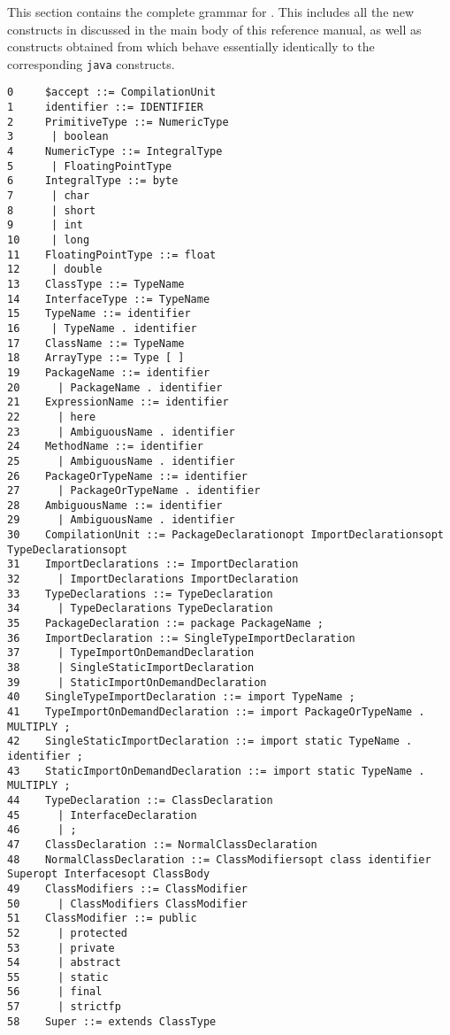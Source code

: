 \label{X10 syntax}

This section contains the complete grammar for \Xten{}. This includes
all the new constructs in \Xten{} discussed in the main body of this
reference manual, as well as constructs obtained from \java{} which
behave essentially identically to the corresponding {\tt java} constructs.
\onecolumn
{\footnotesize
\begin{verbatim}
0     $accept ::= CompilationUnit
1     identifier ::= IDENTIFIER
2     PrimitiveType ::= NumericType
3      | boolean
4     NumericType ::= IntegralType
5      | FloatingPointType
6     IntegralType ::= byte
7      | char
8      | short
9      | int
10     | long
11    FloatingPointType ::= float
12     | double
13    ClassType ::= TypeName
14    InterfaceType ::= TypeName
15    TypeName ::= identifier
16     | TypeName . identifier
17    ClassName ::= TypeName
18    ArrayType ::= Type [ ]
19    PackageName ::= identifier
20      | PackageName . identifier
21    ExpressionName ::= identifier
22      | here
23      | AmbiguousName . identifier
24    MethodName ::= identifier
25      | AmbiguousName . identifier
26    PackageOrTypeName ::= identifier
27      | PackageOrTypeName . identifier
28    AmbiguousName ::= identifier
29      | AmbiguousName . identifier
30    CompilationUnit ::= PackageDeclarationopt ImportDeclarationsopt TypeDeclarationsopt
31    ImportDeclarations ::= ImportDeclaration
32      | ImportDeclarations ImportDeclaration
33    TypeDeclarations ::= TypeDeclaration
34      | TypeDeclarations TypeDeclaration
35    PackageDeclaration ::= package PackageName ;
36    ImportDeclaration ::= SingleTypeImportDeclaration
37      | TypeImportOnDemandDeclaration
38      | SingleStaticImportDeclaration
39      | StaticImportOnDemandDeclaration
40    SingleTypeImportDeclaration ::= import TypeName ;
41    TypeImportOnDemandDeclaration ::= import PackageOrTypeName . MULTIPLY ;
42    SingleStaticImportDeclaration ::= import static TypeName . identifier ;
43    StaticImportOnDemandDeclaration ::= import static TypeName . MULTIPLY ;
44    TypeDeclaration ::= ClassDeclaration
45      | InterfaceDeclaration
46      | ;
47    ClassDeclaration ::= NormalClassDeclaration
48    NormalClassDeclaration ::= ClassModifiersopt class identifier Superopt Interfacesopt ClassBody
49    ClassModifiers ::= ClassModifier
50      | ClassModifiers ClassModifier
51    ClassModifier ::= public
52      | protected
53      | private
54      | abstract
55      | static
56      | final
57      | strictfp
58    Super ::= extends ClassType

\end{verbatim}}
